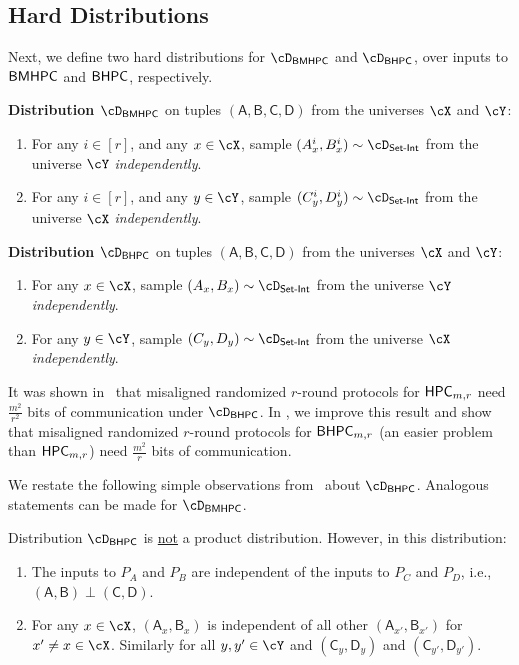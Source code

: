\documentclass[11pt,letterpaper]{article}
\theoremstyle{definition}
\newcommand{\bhpc}{\ensuremath{\textnormal{\textsf{BHPC}}}\xspace}
\newcommand{\bmhpc}{\ensuremath{\textnormal{\textsf{BMHPC}}}\xspace}
\newcommand{\hpc}{\ensuremath{\textnormal{\textsf{HPC}}}\xspace}
\newenvironment{tbox}{\begin{tcolorbox}[
		enlarge top by=5pt,
		enlarge bottom by=5pt,
		 breakable,
		 boxsep=0pt,
                  left=4pt,
                  right=4pt,
                  top=10pt,
                  boxrule=1pt,toprule=1pt,
                  colback=white,
                  arc=-1pt,
                  ]%
	}
{\end{tcolorbox}}
\newcommand{\rA}{\rv{A}}
\newcommand{\rB}{\rv{B}}
\newcommand{\rC}{\rv{C}}
\newcommand{\rD}{\rv{D}}
\newcommand{\rv}[1]{\ensuremath{\mathsf{#1}}}
\newcommand{\SI}{\ensuremath{\textnormal{\textsf{Set-Int}}}\xspace}
\begin{document}
\subsection{Hard Distributions} \label{sec:distribution}


Next, we define two hard distributions for $\cD_\bmhpc$ and $\cD_\bhpc$,  over inputs to $\bmhpc$ and $\bhpc$, respectively. 


\begin{tbox}
    \textbf{Distribution $\cD_\bmhpc$} on tuples $(\rA,\rB,\rC,\rD)$ from the universes $\cX$ and $\cY$: 

    \begin{enumerate}
		\item For any $i\in [r]$, and any $x \in \cX$, sample $(A^i_x,B^i_x) \sim \cD_\SI$ from the universe $\cY$ \emph{independently}. 
		\item For any $i \in [r]$, and any $y \in \cY$, sample $(C^i_y,D^i_y) \sim \cD_\SI$ from the universe $\cX$ \emph{independently}. 
    \end{enumerate}
\end{tbox}

\begin{tbox}
    \textbf{Distribution $\cD_\bhpc$} \cite{AssadiCK19} on tuples $(\rA,\rB,\rC,\rD)$ from the universes $\cX$ and $\cY$: 

    \begin{enumerate}
		\item For any $x \in \cX$, sample $(A_x,B_x) \sim \cD_\SI$ from the universe $\cY$ \emph{independently}. 
		\item For any $y \in \cY$, sample $(C_y,D_y) \sim \cD_\SI$ from the universe $\cX$ \emph{independently}. 
    \end{enumerate}
\end{tbox}

It was shown in~\cite{AssadiCK19} that misaligned randomized $r$-round protocols
for $\hpc_{m,r}$ need $\frac{m^2}{r^2}$ bits of communication under $\cD_\bhpc$.
In , we improve this result and show that
misaligned randomized $r$-round protocols for $\bhpc_{m,r}$ (an easier problem
than $\hpc_{m,r}$) need $\frac{m^2}{r}$ bits of communication.


We restate the following simple observations from~\cite{AssadiCK19} about
$\cD_\bhpc$.
Analogous statements can be made for $\cD_\bmhpc$.

\begin{observation}\label{obs:distHPC}
	Distribution $\cD_\bhpc$ is \underline{not} a product distribution. However, in this distribution: 
	\begin{enumerate}[label=(\roman*)]
		\item The inputs to $P_A$ and $P_B$ are {independent} of the inputs to
      $P_C$ and $P_D$, i.e., $(\rA,\rB) \perp (\rC,\rD)$. 
		\item For any $x \in \cX$, $(\rA_x,\rB_x)$ is independent of all other
      $(\rA_{x'},\rB_{x'})$ for $x'\neq x \in \cX$.
      Similarly for all $y,y' \in \cY$ and $(\rC_y,\rD_y)$ and $(\rC_{y'},\rD_{y'})$. 
	\end{enumerate}
\end{observation}
\end{document}
